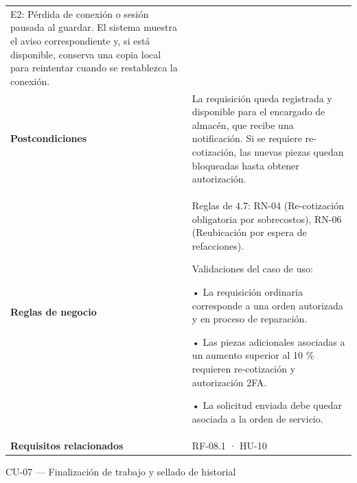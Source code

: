 {\begin{longtable}[]{@{}
  >{\raggedright\arraybackslash}p{}
  >{\raggedright\arraybackslash}p{}@{}}
E2: Pérdida de conexión o sesión pausada al guardar. El sistema muestra
el aviso correspondiente y, si está disponible, conserva una copia local
para reintentar cuando se restablezca la conexión. \\
\textbf{Postcondiciones} & La requisición queda registrada y disponible
para el encargado de almacén, que recibe una notificación. Si se
requiere re-cotización, las nuevas piezas quedan bloqueadas hasta
obtener autorización. \\
\textbf{Reglas de negocio} & Reglas de 4.7: RN-04 (Re-cotización
obligatoria por sobrecostos), RN-06 (Reubicación por espera de
refacciones).

Validaciones del caso de uso:

• La requisición ordinaria corresponde a una orden autorizada y en
proceso de reparación.

• Las piezas adicionales asociadas a un aumento superior al 10 \%
requieren re-cotización y autorización 2FA.

• La solicitud enviada debe quedar asociada a la orden de servicio. \\
\textbf{Requisitos relacionados} & RF-08.1 · HU-10 \\
\end{longtable}
}

CU-07 --- Finalización de trabajo y sellado de historial

